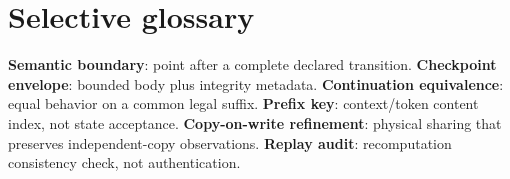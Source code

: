 \section*{Selective glossary}
\textbf{Semantic boundary}: point after a complete declared transition.
\textbf{Checkpoint envelope}: bounded body plus integrity metadata.
\textbf{Continuation equivalence}: equal behavior on a common legal suffix.
\textbf{Prefix key}: context/token content index, not state acceptance.
\textbf{Copy-on-write refinement}: physical sharing that preserves independent-copy
observations.
\textbf{Replay audit}: recomputation consistency check, not authentication.
